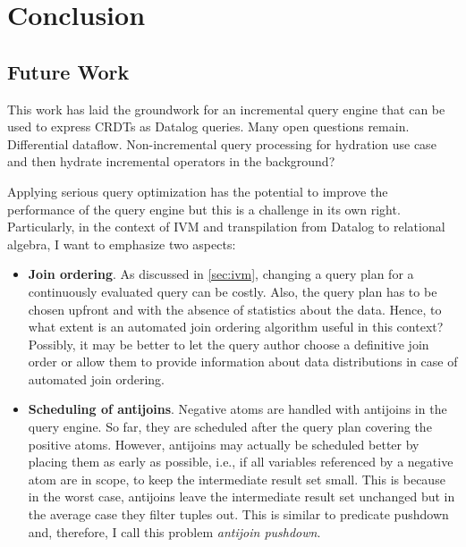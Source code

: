 
\chapter{Conclusion}\label{ch:conclusion}

\section{Future Work}\label{sec:future-work}

This work has laid the groundwork for an incremental query engine
that can be used to express \acp{CRDT} as Datalog queries.
Many open questions remain.
Differential dataflow.
Non-incremental query processing for hydration use case and then hydrate
incremental operators in the background?

Applying serious query optimization has the potential to improve
the performance of the query engine but this is a challenge in its own right.
Particularly, in the context of \ac{IVM} and transpilation from Datalog to
relational algebra, I want to emphasize two aspects:

\begin{itemize}
	\item \textbf{Join ordering}.
	      As discussed in \ref{sec:ivm}, changing a query plan for a continuously
	      evaluated query can be costly.
	      Also, the query plan has to be chosen upfront and with the absence of
	      statistics about the data.
	      Hence, to what extent is an automated join ordering algorithm useful
	      in this context? Possibly, it may be better to let the query
	      author choose a definitive join order or allow them to provide
	      information about data distributions in case of automated join ordering.
	\item \textbf{Scheduling of antijoins}.
	      Negative atoms are handled with antijoins in the query engine.
	      So far, they are scheduled after the query plan covering the
	      positive atoms.
	      However, antijoins may actually be scheduled better by placing them
	      as early as possible, i.e., if all variables referenced by a
	      negative atom are in scope, to keep the intermediate result set small.
	      This is  because in the worst case, antijoins leave the intermediate
	      result set unchanged but in the average case they filter tuples out.
	      This is similar to predicate pushdown and, therefore, I call this
	      problem \emph{antijoin pushdown}.
\end{itemize}


